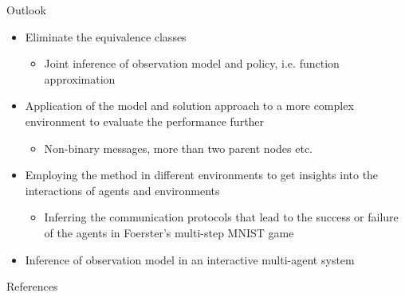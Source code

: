 \documentclass[
english,%
aspectratio=169,%
color={accentcolor=3b},
logo=true,%
colorframetitle=false,%
]{tudabeamer}
\begin{document}
\begin{frame}{Outlook}
\vspace{-5pt}
\begin{itemize}
\item Eliminate the equivalence classes
\begin{itemize}
\item Joint inference of observation model and policy, i.e. function approximation
\end{itemize}
\item Application of the model and solution approach to a more complex
environment to evaluate the performance further
\begin{itemize}
\item Non-binary messages, more than two parent nodes etc.
\end{itemize}
\item Employing the method in different environments to get insights
into the interactions of agents and environments
\begin{itemize}
\item Inferring the communication protocols that lead
to the success or failure of the agents in Foerster's multi-step MNIST game \cite{Foerster2016}
\end{itemize}
\item Inference of observation model in an interactive multi-agent system
\end{itemize}
\centering
{}
\end{frame}


\begin{frame}{References}
\vspace{-10pt}
\small


\end{frame}
\end{document}

